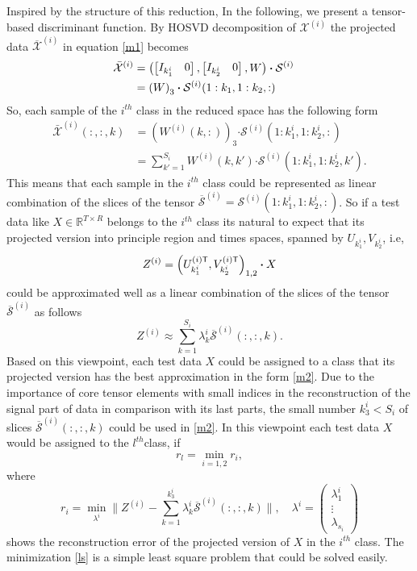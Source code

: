 \documentclass[journal]{IEEEtran}
\begin{document}
	Inspired by the structure of this reduction,  In the following, we present a tensor-based discriminant function.
	By HOSVD decomposition of
	$\mathcal{X}^{(i)}$ the projected data $\overline{\mathcal{X}}^{(i)}$ in equation \eqref{m1} becomes
	\begin{align}
	\bar{\mathcal{X}}^{(i)}&=  \notag
	\left(
	\begin{bmatrix}
	I_{k_1^i} &  0
	\end{bmatrix},
	\begin{bmatrix}
	I_{k_2^i} &  0
	\end{bmatrix},
	W
	\right)\boldsymbol{\cdot} \mathcal{S}^{(i)} \notag
	\\&=\left( 
	W
	\right)_{3} \boldsymbol{\cdot} \mathcal{S}^{(i)}(1:k_1, 1:k_2, :) \notag &
	\end{align}
	So,  each sample of the $i^{th}$ class in the reduced space has the following form
	\begin{align*}
	\bar{{\mathcal{X}}}^{(i)}(:,:,k) &= \left(  
	W^{(i)}(k,:)
	\right)_{3} \boldsymbol{\cdot} \mathcal{S}^{(i)}(1:k_1^i, 1:k_2^i, :)\\
	&= \sum_{k' = 1}^{S_i} W^{(i)}(k,k') \boldsymbol{\cdot} \mathcal{S}^{(i)}(1:k_1^i, 1:k_2^i, k').
	\end{align*}
	This means that each sample in the $i^{th}$ class could be represented as linear combination of the slices  of the tensor $\overline{\mathcal{S}}^{(i)}=\mathcal{S}^{(i)}(1:k_1^i, 1:k_2^i, :)$.
	So if a test data like $X\in \mathbb{R}^{T\times R}$ belongs to the $i^{th}$ class
	its natural to expect that its
	projected version into principle region and times spaces, spanned by $U_{k_1^i},V_{k_2^i}$, i.e,
	\[
	Z^{(i)}= \left( U_{k_1^i}^{(i)\sf T}, V_{k_2^i}^{(i)\sf T} 
	\right)_{1,2}\boldsymbol{\cdot} X
	\]
	could be approximated well as a linear combination of the slices of the tensor $\overline{\mathcal{S}}^{(i)}$ as follows
	\begin{equation}
	\label{m2}
	Z^{(i)} \approx \sum_{k=1}^{S_i} \lambda_k^i \overline{\mathcal{S}}^{(i)}(:,:,k).
	\end{equation}
	Based on this viewpoint, each test data $X$ could be assigned to a class that its projected version has the best approximation in the form \eqref{m2}. 
	Due to the importance of core tensor elements with small indices in the reconstruction of the signal part of data in comparison with its last parts,
	the small number $k_3^i< S_i$  of slices $\overline{\mathcal{S}}^{(i)}(:,:,k)$ could be used in \eqref{m2}. 
	In this viewpoint each test data
	$X$ would be assigned to the $l^{th}$class, if
	\[
	r_{l}=\min_{i=1,2} {r_{i}},
	\]
	where
	\begin{equation}
	\label{ls}
	r_{i}=\min_{{\lambda^{i}}} \|Z^{(i)} -\sum_{k=1}^{k_3^i} \lambda_k^i \overline{\mathcal{S}}^{(i)}(:,:,k)\|,\quad
	\lambda^i=\begin{pmatrix}
	\lambda_1^i\\
	\vdots\\
	\lambda_{s_i}
	\end{pmatrix}
	\end{equation}
	shows the reconstruction error of the projected version of $X$ in the $i^{th}$ class.
	The minimization  \eqref{ls} is a simple least square problem that could be solved easily.
	
\end{document}
